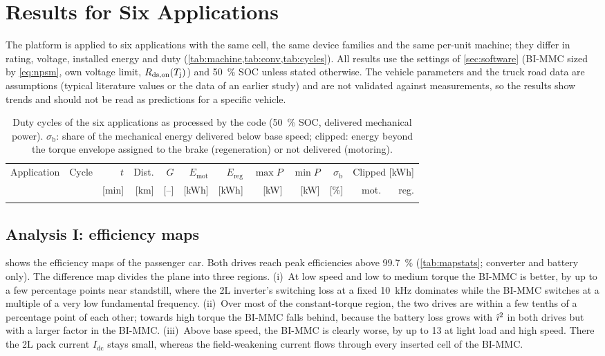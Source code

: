 \section{Results for Six Applications}\label{sec:results}
The platform is applied to six applications with the same cell, the same device families and the same per-unit machine; they differ in rating, voltage, installed energy and duty (\cref{tab:machine,tab:conv,tab:cycles}). All results use the settings of \cref{sec:software} (BI-MMC sized by \cref{eq:npsm}, own voltage limit, $R_\mathrm{ds,on}(T_\mathrm{j})$) and \SI{50}{\percent} SOC unless stated otherwise. The vehicle parameters and the truck road data are assumptions (typical literature values or the data of an earlier study) and are not validated against measurements, so the results show trends and should not be read as predictions for a specific vehicle.

\begin{table}[ht]
\centering
\caption{Duty cycles of the six applications as processed by the code (\SI{50}{\percent} SOC, delivered mechanical power). $\sigma_\mathrm{b}$: share of the mechanical energy delivered below base speed; clipped: energy beyond the torque envelope assigned to the brake (regeneration) or not delivered (motoring).}
\label{tab:cycles}
\footnotesize
\setlength\tabcolsep{3pt}
\begin{tabular}{@{}llrrrrrrrrrr@{}}
\toprule
Application & Cycle & $t$ & Dist. & $G$ & $E_\mathrm{mot}$ & $E_\mathrm{reg}$ & $\max P$ & $\min P$ & $\sigma_\mathrm{b}$ & \multicolumn{2}{c}{Clipped [kWh]} \\
 & & [min] & [km] & [--] & [kWh] & [kWh] & [kW] & [kW] & [\%] & mot. & reg. \\
\midrule
\\
\bottomrule
\end{tabular}
\end{table}

\subsection{Analysis I: efficiency maps}
 shows the efficiency maps of the passenger car. Both drives reach peak efficiencies above \SI{99.7}{\percent} (\cref{tab:mapstats}; converter and battery only). The difference map divides the plane into three regions. (i)~At low speed and low to medium torque the BI-MMC is better, by up to a few percentage points near standstill, where the 2L inverter's switching loss at a fixed \SI{10}{\kilo\hertz} dominates while the BI-MMC switches at a multiple of a very low fundamental frequency. (ii)~Over most of the constant-torque region, the two drives are within a few tenths of a percentage point of each other; towards high torque the BI-MMC falls behind, because the battery loss grows with $\hat\imath^2$ in both drives but with a larger factor in the BI-MMC. (iii)~Above base speed, the BI-MMC is clearly worse, by up to \SI{13}{\pp} at light load and high speed. There the 2L pack current $I_\mathrm{dc}$ stays small, whereas the field-weakening current flows through every inserted cell of the BI-MMC.

